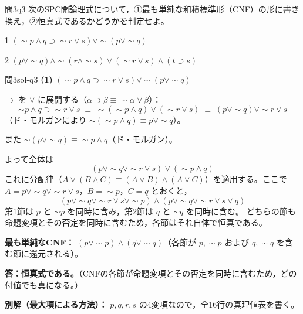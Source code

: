 \documentclass[autodetect-engine,dvi=dvipdfmx,ja=standard]{bxjsarticle}
\begin{document}
\begin{exercise}{問3}{q3}
次のSPC開論理式について，①最も単純な和積標準形（CNF）の形に書き換え，②恒真式であるかどうかを判定せよ。
\begin{pstep}{1}
  \((\sim p\land q\supset\sim r\lor s)\lor\sim(p\lor\sim q)\)
\end{pstep}
\begin{pstep}{2}
  \((p\lor\sim q)\land\sim(r\land\sim s)\lor(\sim r\lor s)\land(t\supset s)\)
\end{pstep}
\end{exercise}

\begin{solution}{問3}{sol-q3}
\textbf{(1)} \((\sim p\land q\supset\sim r\lor s)\lor\sim(p\lor\sim q)\)

\(\supset\) を \(\lor\) に展開する（\(\alpha\supset\beta\equiv\sim\alpha\lor\beta\)）：
\[
  \sim p\land q\supset\sim r\lor s
  \;\equiv\;
  \sim(\sim p\land q)\lor(\sim r\lor s)
  \;\equiv\;
  (p\lor\sim q)\lor\sim r\lor s
\]
（ド・モルガンにより \(\sim(\sim p\land q)\equiv p\lor\sim q\)）。

また \(\sim(p\lor\sim q)\equiv\sim p\land q\)（ド・モルガン）。

よって全体は
\[
  (p\lor\sim q\lor\sim r\lor s)\lor(\sim p\land q)
\]
これに分配律（\(A\lor(B\land C)\equiv(A\lor B)\land(A\lor C)\)）を適用する。ここで
\(A=p\lor\sim q\lor\sim r\lor s\)，\(B=\sim p\)，\(C=q\) とおくと，
\[
  (p\lor\sim q\lor\sim r\lor s\lor\sim p)\land(p\lor\sim q\lor\sim r\lor s\lor q)
\]
第1節は \(p\) と \(\sim p\) を同時に含み，第2節は \(q\) と \(\sim q\) を同時に含む。
どちらの節も命題変項とその否定を同時に含むため，各節はそれ自体で恒真である。

\textbf{最も単純なCNF：} \((p\lor\sim p)\land(q\lor\sim q)\)（各節が \(p,\sim p\) および \(q,\sim q\) を含む節に還元される）。

\textbf{答：恒真式である。}（CNFの各節が命題変項とその否定を同時に含むため，どの付値でも真になる。）

\textbf{別解（最大項による方法）：} \(p,q,r,s\) の4変項なので，全16行の真理値表を書く。


\end{solution}
\end{document}
